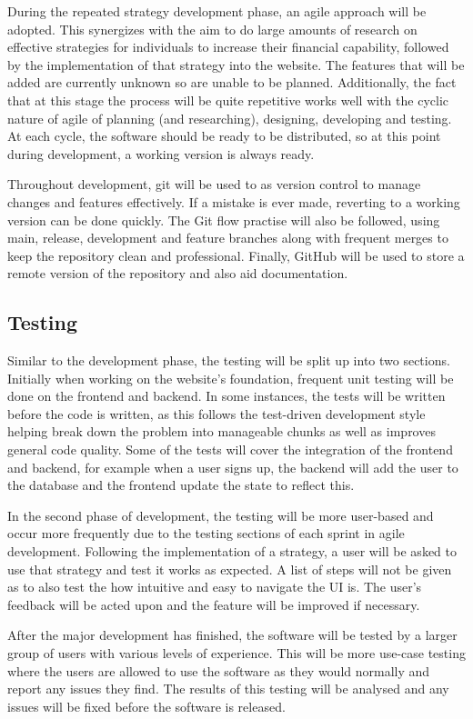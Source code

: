 During the repeated strategy development phase, an agile approach will be adopted. This synergizes with the aim to do large amounts of research on effective strategies for individuals to increase their financial capability, followed by the implementation of that strategy into the website. The features that will be added are currently unknown so are unable to be planned. Additionally, the fact that at this stage the process will be quite repetitive works well with the cyclic nature of agile of planning (and researching), designing, developing and testing. At each cycle, the software should be ready to be distributed, so at this point during development, a working version is always ready.

Throughout development, git will be used to as version control to manage changes and features effectively. If a mistake is ever made, reverting to a working version can be done quickly. The Git flow practise will also be followed, using main, release, development and feature branches along with frequent merges to keep the repository clean and professional. Finally, GitHub will be used to store a remote version of the repository and also aid documentation.

\subsection{Testing}
Similar to the development phase, the testing will be split up into two sections. Initially when working on the website's foundation, frequent unit testing will be done on the frontend and backend. In some instances, the tests will be written before the code is written, as this follows the test-driven development style helping break down the problem into manageable chunks as well as improves general code quality. Some of the tests will cover the integration of the frontend and backend, for example when a user signs up, the backend will add the user to the database and the frontend update the state to reflect this.

In the second phase of development, the testing will be more user-based and occur more frequently due to the testing sections of each sprint in agile development. Following the implementation of a strategy, a user will be asked to use that strategy and test it works as expected. A list of steps will not be given as to also test the how intuitive and easy to navigate the UI is. The user's feedback will be acted upon and the feature will be improved if necessary.

After the major development has finished, the software will be tested by a larger group of users with various levels of experience. This will be more use-case testing where the users are allowed to use the software as they would normally and report any issues they find. The results of this testing will be analysed and any issues will be fixed before the software is released.
